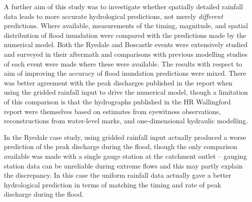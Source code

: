 A further aim of this study was to investigate whether spatially detailed rainfall data leads to more accurate hydrological predictions, not merely \textit{different} predictions. Where available, measurements of the timing, magnitude, and spatial distribution of flood inundation were compared with the predictions made by the numerical model. Both the Ryedale and Boscastle events were extensively studied and surveyed in their aftermath and comparisons with previous modelling studies of each event were made where these were available. The results with respect to aim of improving  the accuracy of flood inundation predictions were mixed. There was better agreement with the peak discharges published in the \citep{wallingford2005flooding} report when using the gridded rainfall input to drive the numerical model, though a limitation of this comparison is that the hydrographs published in the HR Wallingford report were themselves based on estimates from eyewitness observations, reconstructions from water-level marks, and one-dimensional hydraulic modelling. 

In the Ryedale case study, using gridded rainfall input actually produced a worse prediction of the peak discharge during the flood, though the only comparison available was made with a single gauge station at the catchment outlet -- gauging station data can be unreliable during extreme flows and this may partly explain the discrepancy. In this case the uniform rainfall data actually gave a better hydrological prediction in terms of matching the timing and rate of peak discharge during the flood. 

